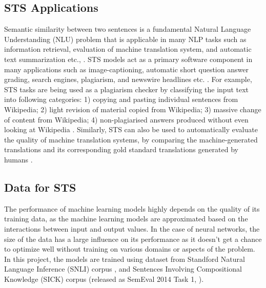 \documentclass[12pt]{report} %
\begin{document}



\subsection{STS Applications}
\label{sts_app}

Semantic similarity between two sentences is a fundamental Natural Language Understanding (NLU) problem that is applicable in many NLP tasks such as information retrieval, evaluation of machine translation system, and automatic text summarization etc., \citep{agirre2016semeval}. STS models act as a primary software component in many applications such as image-captioning, automatic short question answer grading, search engines, plagiarism, and newswire headlines etc. \citep{agirre2016semeval}. For example, STS tasks are being used as a plagiarism checker by classifying the input text into following categories: 1) copying and pasting individual sentences
from Wikipedia; 2) light revision of material copied from Wikipedia; 3) massive change of content from Wikipedia; 4) non-plagiarised answers produced without even looking at Wikipedia \citep{agirre2015semeval}. Similarly, STS can also be used to automatically evaluate the quality of machine translation systems, by comparing the machine-generated translations and its corresponding gold standard translations generated by humans \cite{agirre2015semeval}. 

\subsection{Data for STS}

The performance of machine learning models highly depends on the quality of its training data, as the machine learning models are approximated based on the interactions between input and output values. In the case of neural networks, the size of the data has a large influence on its performance as it doesn't get a chance to optimize well without training on various domains or aspects of the problem. In this project, the models are trained using dataset from Standford Natural Language Inference (SNLI) corpus  \citep{bowman2015large}, and Sentences Involving Compositional
Knowledge (SICK) corpus (released as SemEval 2014 Task 1, \citep{marelli2014semeval}).
\end{document}
